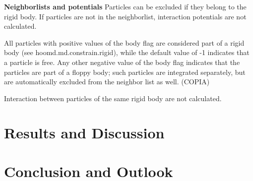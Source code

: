 \documentclass[11pt]{article}
\begin{document}
\textbf{Neighborlists and potentials}
Particles can be excluded if they belong to the rigid body. If particles are not in the neighborlist, interaction potentials are not calculated.

All particles with positive values of the body flag are considered part of a rigid body (see hoomd.md.constrain.rigid), while the default value of -1 indicates that a particle is free. Any other negative value of the body flag indicates that the particles are part of a floppy body; such particles are integrated separately, but are automatically excluded from the neighbor list as well. (COPIA)

Interaction between particles of the same rigid body are not calculated.

\section{Results and Discussion}


\section{Conclusion and Outlook}


\printbibliography
\end{document}
